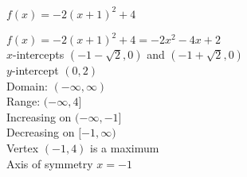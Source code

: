 {$f(x) = -2(x + 1)^{2} + 4$}
{$f(x) = -2(x + 1)^{2} + 4 = -2x^2-4x+2$\\
$x$-intercepts {\small $(-1 - \sqrt{2}, 0)$ and $(-1 + \sqrt{2}, 0)$}\\
$y$-intercept $(0, 2)$\\
Domain: $(-\infty, \infty)$ \\
Range: $(-\infty, 4]$ \\
Increasing on $(-\infty, -1]$ \\
Decreasing on $[-1, \infty)$ \\
Vertex $(-1, 4)$ is a maximum \\
Axis of symmetry $x = -1$ 

\begin{center}
\end{center}
}